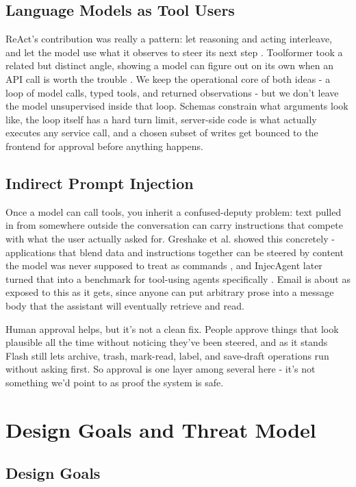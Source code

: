 \documentclass[conference]{IEEEtran}
\begin{document}
\subsection{Language Models as Tool Users}

ReAct's contribution was really a pattern: let reasoning and acting interleave, and let the model use what it observes to steer its next step \cite{yao2023}. Toolformer took a related but distinct angle, showing a model can figure out on its own when an API call is worth the trouble \cite{schick2023}. We keep the operational core of both ideas - a loop of model calls, typed tools, and returned observations - but we don't leave the model unsupervised inside that loop. Schemas constrain what arguments look like, the loop itself has a hard turn limit, server-side code is what actually executes any service call, and a chosen subset of writes get bounced to the frontend for approval before anything happens.

\subsection{Indirect Prompt Injection}

Once a model can call tools, you inherit a confused-deputy problem: text pulled in from somewhere outside the conversation can carry instructions that compete with what the user actually asked for. Greshake et al. showed this concretely - applications that blend data and instructions together can be steered by content the model was never supposed to treat as commands \cite{greshake2023}, and InjecAgent later turned that into a benchmark for tool-using agents specifically \cite{zhan2024}. Email is about as exposed to this as it gets, since anyone can put arbitrary prose into a message body that the assistant will eventually retrieve and read.

Human approval helps, but it's not a clean fix. People approve things that look plausible all the time without noticing they've been steered, and as it stands Flash still lets archive, trash, mark-read, label, and save-draft operations run without asking first. So approval is one layer among several here - it's not something we'd point to as proof the system is safe.

\section{Design Goals and Threat Model}

\subsection{Design Goals}
\end{document}
